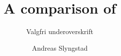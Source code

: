 \documentclass[a4paper, twoside,openright ,titlepage, 12pt]{book}
\title{A comparison of }
\subtitle{Valgfri underoverskrift}
\author{Andreas Slyngstad}
\begin{document}
                                                                                                                          
\masterfrontpage

\tableofcontents
\newtheorem{theorem}{Theorem}[section]
\newtheorem{lemma}[theorem]{Lemma}

%
%
%

%
%
%




\end{document}
